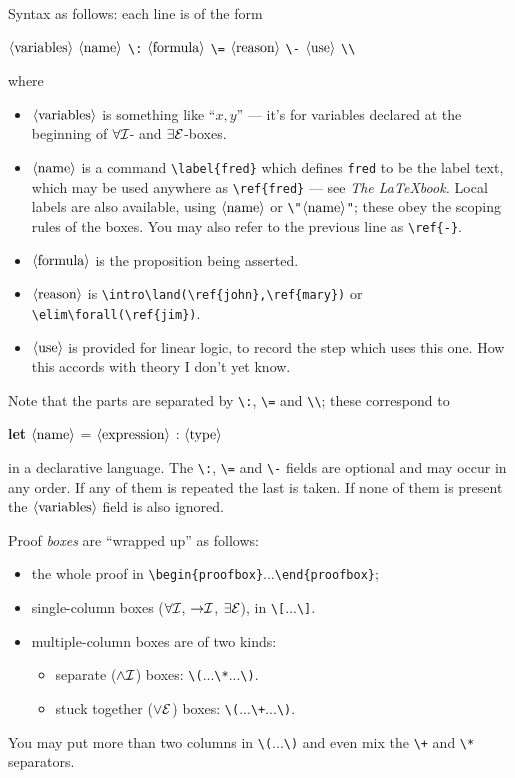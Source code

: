 \documentclass{article}
\def\meta#1{\mbox{$\langle\hbox{#1}\rangle$}}
\def\macrowitharg#1#2{{\tt\string#1\bra\meta{#2}\ket}}
\def\intro#1{{#1}{\cal I}}
\def\elim#1{{#1}{\cal E}}
\let\imp\to
\def\elim#1{{{#1}{\cal E}}}
\def\intro#1{{{#1}{\cal I}}}
\begin{document}
  Syntax as follows:
  each line is of the form
  \begin{center}
     \meta{variables}
     \meta{name}
     \verb/\:/ \meta{formula}
     \verb/\=/ \meta{reason}
     \verb/\-/ \meta{use}
     \verb/\\/
  \end{center}
  where
  \begin{itemize}
  \item \meta{variables} is something like ``$x,y$'' ---
    it's for variables declared at the beginning of $\intro\forall$- and
    $\elim\exists$-boxes.
  \item \meta{name} is a command \verb/\label{fred}/ which
    defines \verb/fred/ to be the label text, which may be used anywhere
    as \verb/\ref{fred}/ --- see {\em The \LaTeX book.}
    Local labels are also available, using \macrowitharg\lbl{name}
    or \verb/\"/\meta{name}\verb/"/; these obey the scoping rules of
    the boxes.
    You may also refer to the previous line as \verb/\ref{-}/.
  \item \meta{formula} is the proposition being asserted.
  \item \meta{reason} is \verb/\intro\land(\ref{john},\ref{mary})/
         or \verb/\elim\forall(\ref{jim})/.
  \item \meta{use} is provided for linear logic, to record the step
         which uses this one. How this accords with theory I don't yet know.
  \end{itemize}
  Note that the parts are separated by \verb/\:/, \verb/\=/ and \verb/\\/;
  these correspond to
  \begin{center}
     {\bf let } \meta{name} = \meta{expression} : \meta{type}
  \end{center}
  in a declarative language.
  The \verb/\:/, \verb/\=/ and \verb/\-/ fields are optional and may occur
  in any order. If any of them is repeated the last is taken.
  If none of them is present the \meta{variables} field is also ignored.

  Proof {\em boxes\/} are ``wrapped up'' as follows:
  \begin{itemize}
  \item the whole proof in \verb/\begin{proofbox}/...\verb/\end{proofbox}/;
  \item single-column boxes ($\intro\forall$, $\intro\imp$, $\elim\exists$),
      in \verb/\[/...\verb/\]/.
  \item multiple-column boxes are of two kinds:
    \begin{itemize}
     \item separate ($\intro\land$) boxes: \verb/\(/...\verb/\*/...\verb/\)/.
     \item stuck together ($\elim\lor$) boxes:
        \verb/\(/...\verb/\+/...\verb/\)/.
    \end{itemize}
  \end{itemize}
  You may put more than two columns in \verb/\(/...\verb/\)/ and even mix
  the \verb/\+/ and \verb/\*/ separators.
\end{document}
